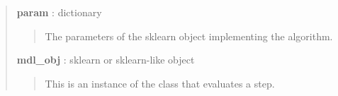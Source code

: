 \documentclass[letterpaper,10pt,english]{sphinxmanual}
\begin{document}
\begin{fulllineitems}
\begin{quote}
\begin{description}
\textbf{param} : dictionary
\begin{quote}

The parameters of the sklearn object implementing the algorithm.
\end{quote}

\textbf{mdl\_obj} : sklearn or sklearn-like object
\begin{quote}

This is an instance of the class that evaluates a step.
\end{quote}

\end{description}\end{quote}

\end{fulllineitems}

\end{document}
